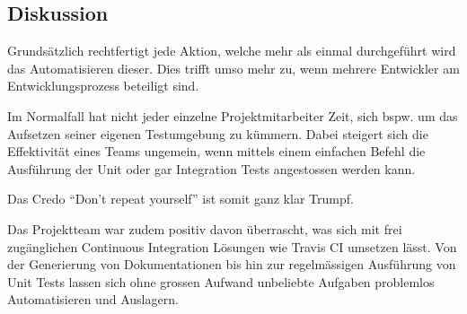 \subsection*{Diskussion}
Grundsätzlich rechtfertigt jede Aktion, welche mehr als einmal durchgeführt wird das Automatisieren dieser. Dies trifft umso mehr zu, wenn mehrere Entwickler am Entwicklungsprozess beteiligt sind.

Im Normalfall hat nicht jeder einzelne Projektmitarbeiter Zeit, sich bspw. um das Aufsetzen seiner eigenen Testumgebung zu kümmern. Dabei steigert sich die Effektivität eines Teams ungemein, wenn mittels einem einfachen Befehl die Ausführung der Unit oder gar Integration Tests angestossen werden kann.

Das Credo ``Don't repeat yourself'' ist somit ganz klar Trumpf.

Das Projektteam war zudem positiv davon überrascht, was sich mit frei zugänglichen Continuous Integration Lösungen wie Travis CI \cite{TravisCI} umsetzen lässt. Von der Generierung von Dokumentationen bis hin zur regelmässigen Ausführung von Unit Tests lassen sich ohne grossen Aufwand unbeliebte Aufgaben problemlos Automatisieren und Auslagern.